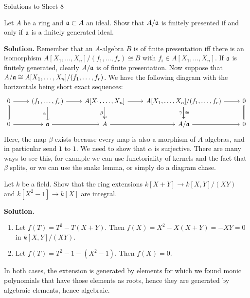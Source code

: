 \documentclass[a4paper,11pt]{article}
\begin{document}
\begin{center}
    \huge{Solutions to Sheet 8}
\end{center}

Let $A$ be a ring and $\mathfrak{a} \subset A$ an ideal. Show that $A/\mathfrak{a}$ is finitely 
presented if and only if $\mathfrak{a}$ is a finitely generated ideal.

\textbf{Solution.} 
Remember that an $A$-algebra $B$ is of finite presentation iff there is an isomorphism
$A[X_1, \dots, X_n]/(f_1, \dots, f_r) \cong B$ with $f_i \in A[X_1, \dots,
X_n]$. If $\mathfrak{a}$ is finitely generated, clearly $A/\mathfrak{a}$ is of finite
presentation. Now suppose that $A/\mathfrak{a} \cong A[X_1, \dots, X_n]/(f_1, \dots, f_r)$. 
We have the following diagram with the horizontals being short exact sequences:
\[
\begin{tikzcd}[ampersand replacement=\&]
	0 \& {(f_1, \dots, f_r)} \& {A[X_1, \dots, X_n]} \& {A[X_1, \dots, X_n]/(f_1, \dots, f_r)} \& 0 \\
	0 \& \fa \& A \& {A/\fa} \& 0
	\arrow[from=1-2, to=1-3]
	\arrow[from=1-3, to=1-4]
	\arrow[from=1-1, to=1-2]
	\arrow[from=1-4, to=1-5]
	\arrow[from=2-1, to=2-2]
	\arrow[from=2-2, to=2-3]
	\arrow[from=2-3, to=2-4]
	\arrow["\cong", from=1-4, to=2-4]
	\arrow["\beta"', two heads, from=1-3, to=2-3]
	\arrow["\alpha"', from=1-2, to=2-2]
	\arrow[from=2-4, to=2-5]
	\arrow[Rightarrow, no head, from=1-5, to=2-5]
	\arrow[Rightarrow, no head, from=1-1, to=2-1]
	\arrow["\gamma"', from=1-4, to=2-4]
\end{tikzcd}
\]
Here, the map $\beta$ exists because every map is also a morphism of $A$-algebras,
and in particular send $1$ to $1$.
We need to show that $\alpha$ is surjective. There are many ways to see this, for example
we can use functoriality of kernels and the fact that $\beta$ splits, or we can use
the snake lemma, or simply do a diagram chase. 

Let $k$ be a field. Show that the ring extensions $k[X+Y] \to k[X,Y]/(XY)$ and
$k[X^2-1] \to k[X]$ are integral.

\textbf{Solution.} 
\begin{enumerate}
    \item Let $f(T) = T^2-T(X+Y)$. Then $f(X) = X^2 - X(X+Y) = -XY = 0$ in $k[X,Y]/(XY)$.
    \item Let $f(T) = T^2-1 - (X^2-1)$. Then $f(X) = 0$.
\end{enumerate}
In both cases, the extension is generated by elements for which we found monic polynomials
that have those elements as roots, hence they are generated by algebraic elements, 
hence algebraic.
\end{document}
